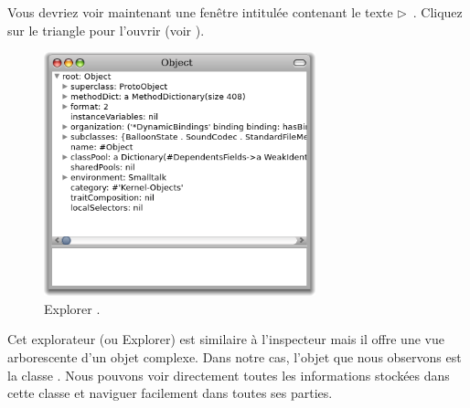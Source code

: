 \documentclass[a4paper,10pt,twoside]{book}
\begin{document}

Vous devriez voir maintenant une fenêtre intitulée 
contenant le texte \mbox{$\triangleright$ \mbox{}{}.}
Cliquez sur le triangle pour l'ouvrir (voir ).

\begin{figure}[htb]
\centerline {\includegraphics[width=0.7\textwidth]{ExploreIt}}
\caption{Explorer \mbox{.}}
\end{figure}

Cet explorateur (ou Explorer) est similaire à l'inspecteur mais il
offre une vue arborescente d'un objet complexe.
Dans notre cas, l'objet que nous observons est la classe \mbox{.}
Nous pouvons voir directement toutes les informations stockées dans
cette classe et naviguer facilement dans toutes ses parties.


\end{document}
